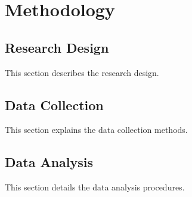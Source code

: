 \chapter{Methodology}
\label{chap:methodology}

\section{Research Design}
This section describes the research design.

\section{Data Collection}
This section explains the data collection methods.

\section{Data Analysis}
This section details the data analysis procedures.
